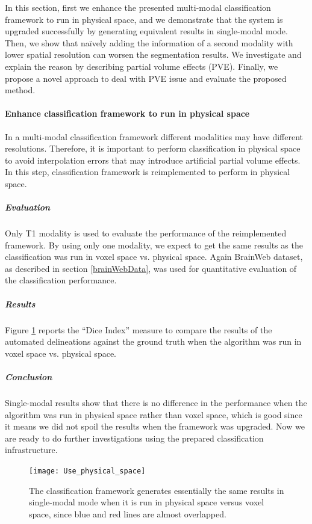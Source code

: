 In this section, first we enhance the presented multi-modal classification framework to run in physical space, and we demonstrate that the system is upgraded successfully by generating equivalent results in single-modal mode. 
Then, we show that na\"{i}vely adding the information of a second modality with lower spatial resolution can worsen the segmentation results. We investigate and explain the reason by describing partial volume effects (PVE). Finally, we propose a novel approach to deal with PVE issue and evaluate the proposed method.

\paragraph{Enhance classification framework to run in physical space} %

In a multi-modal classification framework different modalities may have different resolutions.
Therefore, it is important to perform classification in physical space to avoid interpolation errors that may introduce artificial partial volume effects.
In this step, classification framework is reimplemented to perform in physical space.

\subparagraph{Evaluation}
Only T1 modality is used to evaluate the performance of the reimplemented framework. By using only one modality, we expect to get the same results as the classification was run in voxel space vs. physical space. 
Again BrainWeb dataset, as described in section \ref{brainWebData}, was used for quantitative evaluation of the classification performance.

\subparagraph{Results}
Figure \ref{Use_physical_space} reports the ``Dice Index'' measure to compare the results of the automated delineations against the ground truth when the algorithm was run in voxel space vs. physical space.

\subparagraph{Conclusion}
Single-modal results show that there is no difference in the performance when the algorithm was run in physical space rather than voxel space, which is good since it means we did not spoil the results when the framework was upgraded. Now we are ready to do further investigations using the prepared classification infrastructure.

\begin{figure}[ht]
\centering
\texttt{[image: Use\_physical\_space]}\
\centering
\caption{The classification framework generates essentially the same results in single-modal mode when it is run in physical space versus voxel space, since blue and red lines are almost overlapped.} 
\label{Use_physical_space}
\end{figure}

